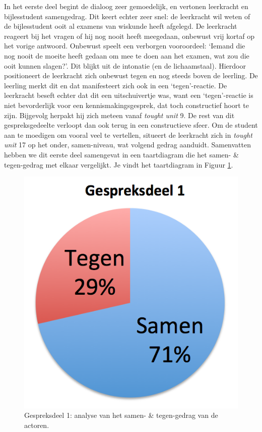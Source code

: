 \documentclass[a4paper,12pt]{article}
\theoremstyle{definition}
\begin{document}
In het eerste deel begint de dialoog zeer gemoedelijk, en vertonen leerkracht en 
bijlesstudent samengedrag. Dit keert echter zeer snel: de leerkracht wil weten 
of de bijlesstudent ooit al examens van wiskunde heeft afgelegd. De leerkracht reageert bij het vragen of hij nog nooit heeft meegedaan,
 onbewust vrij kortaf op het vorige antwoord. Onbewust speelt een verborgen vooroordeel: `Iemand die nog nooit de moeite heeft gedaan om mee te doen aan het examen, wat zou die ooit kunnen slagen?'. 
 Dit blijkt uit de intonatie (en de lichaamstaal). Hierdoor positioneert de leerkracht zich onbewust tegen en nog steeds boven de 
 leerling. De leerling merkt dit en dat manifesteert zich ook in een 
 `tegen'-reactie. De leerkracht beseft echter dat dit een uitschuivertje was, 
 want een `tegen'-reactie is niet bevorderlijk voor een kennismakingsgesprek, 
 dat toch constructief hoort te zijn. Bijgevolg herpakt hij zich meteen vanaf 
 \emph{tought unit} 9. De rest van dit gespreksgedeelte verloopt dan ook terug 
 in een constructieve sfeer. Om de student aan te moedigen om vooral veel te 
 vertellen, situeert de leerkracht zich in \emph{tought unit} 17 op het onder, 
 samen-niveau, wat volgend gedrag aanduidt. Samenvatten hebben we dit eerste deel 
 samengevat in een taartdiagram die het samen- \& tegen-gedrag met elkaar 
 vergelijkt. Je vindt het taartdiagram in Figuur \ref{2}.\\
 \begin{figure}[h]
  \centering
  \includegraphics[scale=0.8]{grafiek2.png}\caption{Gespreksdeel 1: analyse van 
het samen- \& tegen-gedrag van de actoren.}\label{2}
\end{figure}
\end{document}
